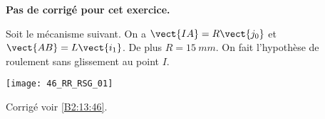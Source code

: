 \normalfalse \difficiletrue \tdifficilefalse
\correctionfalse


\setcounter{numques}{0}
\ifcorrection
\else
\textbf{Pas de corrigé pour cet exercice.}
\fi

\ifprof
\else
Soit le mécanisme suivant. On a $\vect{IA}=R\vect{j_0}$ et $\vect{AB}=L\vect{i_1}$. De plus $R=\SI{15}{mm}$. On fait l'hypothèse de roulement sans glissement au point $I$.
\begin{center}
\texttt{[image: 46\_RR\_RSG\_01]}
\end{center}
\fi


\ifprof
\else
\fi

\ifprof
\else
\fi

\ifprof
\else
\fi


\ifprof
\else
\begin{flushright}
\footnotesize{Corrigé  voir \ref{B2:13:46}.}
\end{flushright}%
\fi